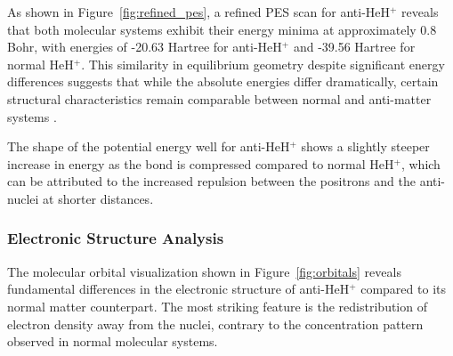 \documentclass[10pt,twocolumn,a4paper]{article}
\begin{document}
As shown in Figure~\ref{fig:refined_pes}, a refined PES scan for anti-HeH$^+$ reveals that both molecular systems exhibit their energy minima at approximately 0.8 Bohr, with energies of -20.63 Hartree for anti-HeH$^+$ and -39.56 Hartree for normal HeH$^+$. This similarity in equilibrium geometry despite significant energy differences suggests that while the absolute energies differ dramatically, certain structural characteristics remain comparable between normal and anti-matter systems \cite{chardonnet2021theoretical}.

The shape of the potential energy well for anti-HeH$^+$ shows a slightly steeper increase in energy as the bond is compressed compared to normal HeH$^+$, which can be attributed to the increased repulsion between the positrons and the anti-nuclei at shorter distances.

\subsubsection{Electronic Structure Analysis}
The molecular orbital visualization shown in Figure~\ref{fig:orbitals} reveals fundamental differences in the electronic structure of anti-HeH$^+$ compared to its normal matter counterpart. The most striking feature is the redistribution of electron density away from the nuclei, contrary to the concentration pattern observed in normal molecular systems.
\end{document}
